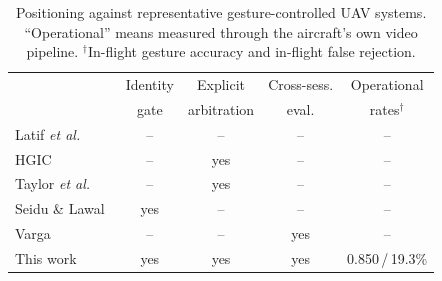 \begin{table}[t]
\caption{Positioning against representative gesture-controlled UAV systems.
``Operational'' means measured through the aircraft's own video pipeline.
$^{\dagger}$In-flight gesture accuracy and in-flight false rejection.}
\label{tab:related}
\centering
\footnotesize
\setlength{\tabcolsep}{4pt}
\renewcommand{\arraystretch}{1.02}
\begin{tabular}{@{}lcccc@{}}
\toprule
& Identity & Explicit & Cross-sess. & Operational \\
& gate & arbitration & eval. & rates$^{\dagger}$ \\
\midrule
Latif \emph{et al.}~\cite{latif2022}      & --  & --  & --  & -- \\
HGIC~\cite{hu2024hgic}                    & --  & yes & --  & -- \\
Taylor \emph{et al.}~\cite{taylor2025}    & --  & yes & --  & -- \\
Seidu \& Lawal~\cite{seidu2024}           & yes & --  & --  & -- \\
Varga~\cite{varga2026}                    & --  & --  & yes & -- \\
\midrule
This work                                 & yes & yes & yes & 0.850\,/\,19.3\% \\
\bottomrule
\end{tabular}
\end{table}

